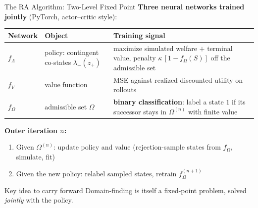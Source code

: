 \documentclass[10pt,aspectratio=169]{beamer}
\newcommand{\compacttables}{\renewcommand{\arraystretch}{1.15}}
\begin{document}
\begin{frame}[label=mainRAalgo]{The RA Algorithm: Two-Level Fixed Point}
\textbf{Three neural networks trained jointly} (PyTorch, actor--critic style):

\smallskip
\compacttables
\begin{center}\footnotesize
\begin{tabular}{p{1.5cm}p{4.4cm}p{5.8cm}}
\toprule
\textbf{Network} & \textbf{Object} & \textbf{Training signal} \\
\midrule
$f_\Lambda$ & policy: contingent co-states $\lambda_+(z_+)$ & maximize simulated welfare $+$ terminal value, penalty $\kappa\,[1-f_\Omega(S)]$ off the admissible set \\
$f_V$ & value function & MSE against realized discounted utility on rollouts \\
$f_\Omega$ & admissible set $\Omega$ & \textbf{binary classification}: label a state $1$ if its successor stays in $\Omega^{(n)}$ with finite value \\
\bottomrule
\end{tabular}
\end{center}

\smallskip
{\small\textbf{Outer iteration $n$:}}
\begin{enumerate}\small\itemsep1pt
    \item Given $\Omega^{(n)}$: update policy and value (rejection-sample states from $f_\Omega$, simulate, fit)
    \item Given the new policy: relabel sampled states, retrain $f_\Omega^{(n+1)}$
\end{enumerate}
\begin{block}{Key idea to carry forward}
\small Domain-finding is itself a fixed-point problem, solved \emph{jointly} with the policy.
\end{block}
\vspace{0.3em}\hfill
\hyperlink{appRAprob}{}\hspace{0.4em}%
\hyperlink{appRAalgo}{}
\end{frame}
\end{document}
